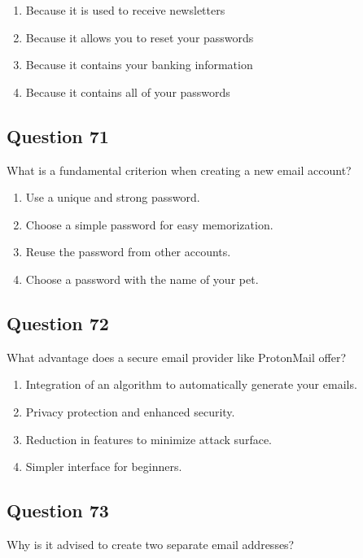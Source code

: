 \documentclass[12pt,a4paper]{article}
\begin{document}
\begin{enumerate}[label=\Alph*., leftmargin=*]
\item Because it is used to receive newsletters
\item Because it allows you to reset your passwords
\item Because it contains your banking information
\item Because it contains all of your passwords
\end{enumerate}

\bigskip


\subsection*{Question 71}
What is a fundamental criterion when creating a new email account?

\begin{enumerate}[label=\Alph*., leftmargin=*]
\item Use a unique and strong password.
\item Choose a simple password for easy memorization.
\item Reuse the password from other accounts.
\item Choose a password with the name of your pet.
\end{enumerate}

\bigskip


\subsection*{Question 72}
What advantage does a secure email provider like ProtonMail offer?

\begin{enumerate}[label=\Alph*., leftmargin=*]
\item Integration of an algorithm to automatically generate your emails.
\item Privacy protection and enhanced security.
\item Reduction in features to minimize attack surface.
\item Simpler interface for beginners.
\end{enumerate}

\bigskip


\subsection*{Question 73}
Why is it advised to create two separate email addresses?
\end{document}
